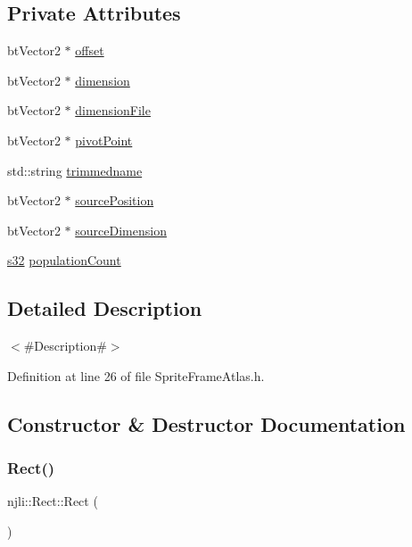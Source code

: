 \subsection*{Private Attributes}
\begin{DoxyCompactItemize}
\item 
bt\+Vector2 $\ast$ \mbox{\hyperlink{classnjli_1_1_rect_a6f23c542bdc39901ed8fdb494f3be56f}{offset}}
\item 
bt\+Vector2 $\ast$ \mbox{\hyperlink{classnjli_1_1_rect_a1f9f935a849b021e525e470c9b4b27aa}{dimension}}
\item 
bt\+Vector2 $\ast$ \mbox{\hyperlink{classnjli_1_1_rect_aa07d368205936a23ab9a47552b4e13c9}{dimension\+File}}
\item 
bt\+Vector2 $\ast$ \mbox{\hyperlink{classnjli_1_1_rect_a5108b573ccf0471fe3df6d8b81409584}{pivot\+Point}}
\item 
std\+::string \mbox{\hyperlink{classnjli_1_1_rect_a2caf9b5b79ddae7f604841cfdbbbb93f}{trimmedname}}
\item 
bt\+Vector2 $\ast$ \mbox{\hyperlink{classnjli_1_1_rect_a4ea7c70282ea45aeb109a7efaaf8c979}{source\+Position}}
\item 
bt\+Vector2 $\ast$ \mbox{\hyperlink{classnjli_1_1_rect_a1066fad026f447110bc3c4efe0ff3a32}{source\+Dimension}}
\item 
\mbox{\hyperlink{_util_8h_aa62c75d314a0d1f37f79c4b73b2292e2}{s32}} \mbox{\hyperlink{classnjli_1_1_rect_a200cc3b5b916522d04e3efab3e0d81e7}{population\+Count}}
\end{DoxyCompactItemize}


\subsection{Detailed Description}
$<$\#\+Description\#$>$ 

Definition at line 26 of file Sprite\+Frame\+Atlas.\+h.



\subsection{Constructor \& Destructor Documentation}
\mbox{\label{classnjli_1_1_rect_a2c25e6a42c5f9e1b65817767a1623551}} 
\subsubsection{\texorpdfstring{Rect()}{Rect()}\hspace{0.1cm}{\footnotesize\ttfamily [1/2]}}
{\footnotesize\ttfamily njli\+::\+Rect\+::\+Rect (\begin{DoxyParamCaption}{ }\end{DoxyParamCaption})}

